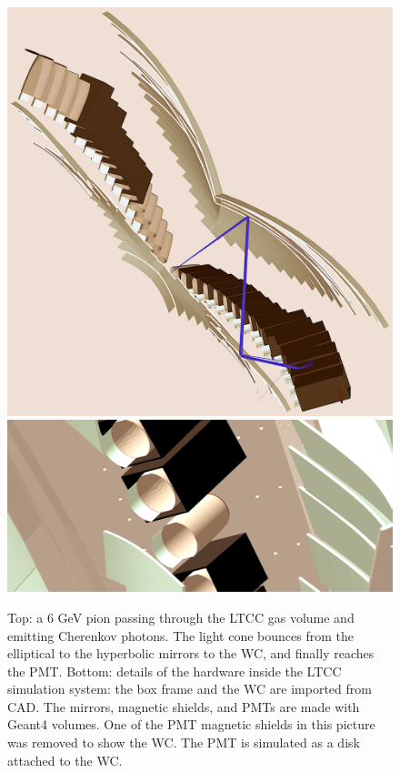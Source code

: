 \begin{figure}
	\centering
	\includegraphics[width=0.99\columnwidth, keepaspectratio]{img/ltccGeometry.png}
	\includegraphics[width=0.99\columnwidth, keepaspectratio]{img/ltccDetail.png}
	\caption{Top: a 6 GeV pion passing through the LTCC gas volume and emitting Cherenkov photons. The light cone
            bounces from the elliptical to the hyperbolic mirrors to the WC, and finally reaches the PMT.
            Bottom: details of the hardware inside the LTCC simulation system: the box frame and the WC are
            imported from CAD. The mirrors, magnetic shields, and PMTs are made with Geant4 volumes.
            One of the PMT magnetic shields
            in this picture was removed to show the WC. The PMT is simulated as a disk attached to the WC. }
	\label{fig:ltccGeometry}
\end{figure}
 

